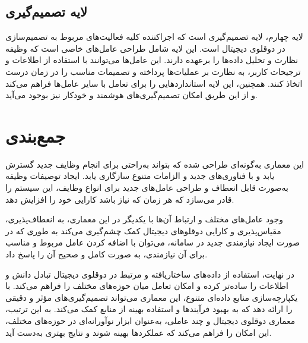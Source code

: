 \subsection{لایه تصمیم‌گیری}
لایه چهارم، لایه تصمیم‌گیری است که اجرا‌کننده کلیه فعالیت‌های مربوط به تصمیم‌سازی در دوقلوی دیجیتال است. این لایه شامل طراحی عامل‌های خاصی است که وظیفه نظارت و تحلیل داده‌ها را برعهده دارند. این عامل‌ها می‌توانند با استفاده از اطلاعات و ترجیحات کاربر، به نظارت بر عملیات‌ها پرداخته و تصمیمات مناسب را در زمان درست اتخاذ کنند. همچنین، این لایه استانداردهایی را برای تعامل با سایر عامل‌ها فراهم می‌کند و از این طریق امکان تصمیم‌گیری‌های هوشمند و خودکار نیز بوجود می‌آید.

\section{جمع‌بندی}

این معماری به‌گونه‌ای طراحی شده که بتواند به‌راحتی برای انجام وظایف جدید گسترش یابد و با فناوری‌های جدید و الزامات متنوع سازگاری یابد. ایجاد توصیفات وظیفه به‌صورت قابل انعطاف و طراحی عامل‌های جدید برای انواع وظایف، این سیستم را قادر می‌سازد که هر زمان که نیاز باشد کارایی خود را افزایش دهد.

وجود عامل‌های مختلف و ارتباط آن‌ها با یکدیگر در این معماری، به انعطاف‌پذیری، مقیاس‌پذیری و کارایی دوقلو‌های دیجیتال کمک چشم‌گیری می‌کند به طوری که در صورت ایجاد نیازمندی جدید در سامانه،‌ می‌توان با اضافه کردن عامل مربوط و مناسب برای آن نیازمندی، به صورت کامل و صحیح آن را پاسخ داد.

در نهایت، استفاده از داده‌های ساختاریافته و مرتبط در دوقلوی دیجیتال تبادل دانش و اطلاعات را ساده‌تر کرده و امکان تعامل میان حوزه‌های مختلف را فراهم می‌کند. با یکپارچه‌سازی منابع داده‌ای متنوع، این معماری می‌تواند تصمیم‌گیری‌های مؤثر و دقیقی را ارائه دهد که به بهبود فرآیندها و استفاده بهینه از منابع کمک می‌کند. به این ترتیب، معماری دوقلوی دیجیتال و چند عاملی، به‌عنوان ابزار نوآورانه‌ای در حوزه‌های مختلف، این امکان را فراهم می‌کند که عملکردها بهینه شوند و نتایج بهتری به‌دست آید.